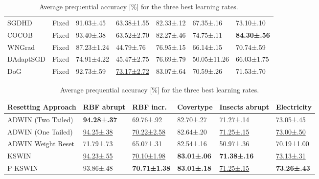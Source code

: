 \documentclass[letterpaper]{article} %
\begin{document}
\begin{table}[t]
\begin{tabular}{lllllll}
		SGDHD                    & Fixed        & 91.03±.45             & 63.38±1.55             & 82.33±.12             & 67.35±.16            & 73.10±.10            \\
		COCOB                    & Fixed        & 93.40±.38             & 63.52±2.70             & 82.27±.46             & 74.75±.11            & \bfseries{84.30±.56} \\
		WNGrad                   & Fixed        & 87.23±1.24            & 44.79±.76              & 76.95±.15             & 66.14±.15            & 70.74±.59            \\
		DAdaptSGD                & Fixed        & 74.91±4.22            & 45.47±2.75             & 76.69±.79             & 50.05±11.26          & 66.03±1.75           \\
		DoG                      & Fixed        & 92.73±.59             & \underline{73.17±2.72} & 83.07±.64             & 70.59±.26            & 71.53±.70            \\
		\bottomrule
	\end{tabular}
	\caption{Average prequential accuracy [\%] for the three best learning rates.}\label{tab:top3_accuray}
\end{table}

\begin{table}
	\small
	\centering
	\begin{tabular}{llllll}
		\toprule
		Resetting Approach & RBF abrupt            & RBF incr.              & Covertype           & Insects abrupt        & Electricity           \\
		\midrule
		ADWIN (Two Tailed) & \bfseries{94.28±.37}  & \underline{69.76±.92}  & 82.70±.27           & \underline{71.27±.14} & \underline{73.05±.45} \\
		ADWIN (One Tailed) & \underline{94.25±.38} & \underline{70.22±2.58} & 82.64±.20           & \underline{71.25±.15} & \underline{73.00±.50} \\
		ADWIN Weight Reset & 71.79±.73             & 65.07±.31              & 82.54±.16           & 50.97±.36             & 70.19±1.00            \\
		KSWIN              & \underline{94.23±.55} & \underline{70.10±1.98} & \bfseries 83.01±.06 & \bfseries 71.38±.16   & \underline{73.13±.31} \\
		P-KSWIN            & 93.86±.48             & \bfseries 70.71±1.38   & \bfseries 83.01±.18 & \underline{71.25±.15} & \bfseries 73.26±.43   \\
		\bottomrule
	\end{tabular}
	\caption{Average prequential accuracy [\%] for the three best learning rates.}
\end{table}
\end{document}

